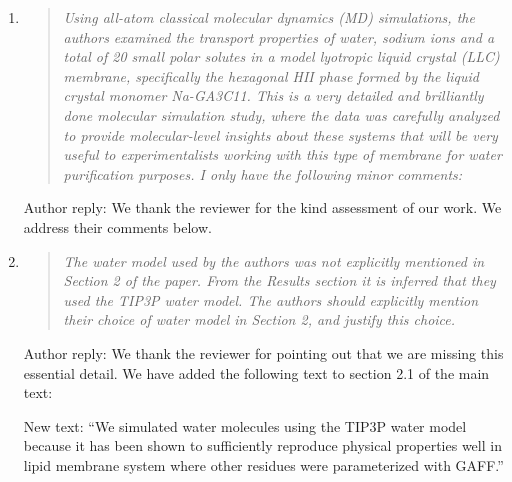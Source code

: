 \documentclass{article}
\begin{document}
\begin{enumerate}
	
	\item \begin{quote} \textit{Using all-atom classical molecular dynamics (MD) simulations,
	the authors examined the transport properties of water, sodium ions and a total of 20 
	small polar solutes in a model lyotropic liquid crystal (LLC) membrane, specifically the
	hexagonal HII phase formed by the liquid crystal monomer Na-GA3C11. This is a very 
	detailed and brilliantly done molecular simulation study, where the data was carefully 
	analyzed to provide molecular-level insights about these systems that will be very 
	useful to experimentalists working with this type of membrane for water purification 
	purposes. I only have the following minor comments: }\end{quote}
	
	Author reply: We thank the reviewer for the kind assessment of our work. We address their
	comments below.
	
	\item \begin{quote}
	
	\textit{The water model used by the authors was not explicitly mentioned in Section 2 
	of the paper. From the Results section it is inferred that they used the TIP3P water model.
	The authors should explicitly mention their choice of water model in Section 2, and 
	justify this choice.}
	
	\end{quote}
	
	Author reply: We thank the reviewer for pointing out that we are missing this essential detail.
	We have added the following text to section 2.1 of the main text:

	New text: ``We simulated water molecules using the TIP3P water model because it 
	has been shown to sufficiently reproduce physical properties well in lipid membrane
	system where other residues were parameterized with GAFF.''

    

\end{enumerate}
\end{document}
